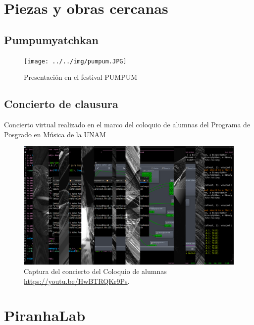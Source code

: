 \section{Piezas y obras cercanas} %

\subsection{Pumpumyatchkan}

\begin{figure}[tb]
\centering 
\texttt{[image: ../../img/pumpum.JPG]} 
\caption[Concierto PUMPUM]{Presentación en el festival PUMPUM} %
\label{fig:gallery} 
\end{figure}

\subsection{Concierto de clausura} %

Concierto virtual realizado en el marco del coloquio de alumnas del Programa de Posgrado en Música de la UNAM

\begin{figure}[tb]
\centering 
\includegraphics[width=\columnwidth]{../../img/col2.png} 
\caption[Concierto coloquio]{Captura del concierto del Coloquio de alumnas \url{https://youtu.be/HwBTRQKr9Ps}.} %
\label{fig:gallery} 
\end{figure}

\section{PiranhaLab}

